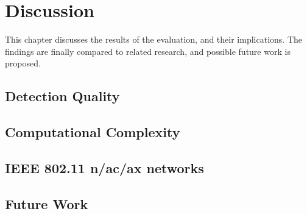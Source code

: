
\chapter{Discussion}\label{ch:Discussion}
\glsresetall %

This chapter discusses the results of the evaluation, and their implications. The findings are finally compared to related research, and possible future work is proposed.



\section{Detection Quality}\label{sec:detection-quality}



\section{Computational Complexity}



\section{IEEE 802.11 n/ac/ax networks}



\section{Future Work}
